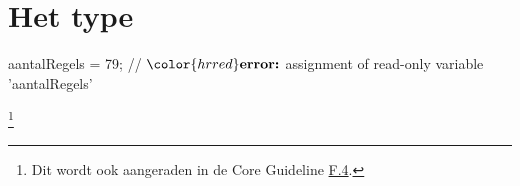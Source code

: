 \section[Het type \texttt{string}]{Het type \texorpdfstring{}{string}}
\label{sec:string}

\begin{cpplstfragment}[mathescape=true]
aantalRegels = 79;
//  $\color{hrred}\textbf{error:}$ assignment of read-only variable 'aantalRegels'
\end{cpplstfragment}

\footnote{%
	Dit wordt ook aangeraden in de \Cpp{} Core Guideline \href{https://isocpp.github.io/CppCoreGuidelines/CppCoreGuidelines\#f4-if-a-function-may-have-to-be-evaluated-at-compile-time-declare-it-constexpr}{F.4}.
}
